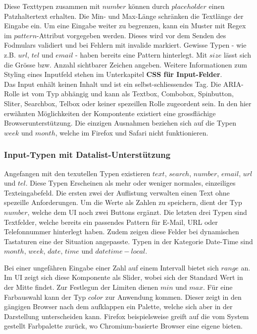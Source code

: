 Diese Texttypen zusammen mit $number$ können durch $placeholder$ einen Patzhaltertext erhalten.
Die Min- und Max-Länge schränken die Textlänge der Eingabe ein.
Um eine Eingabe weiter zu begrenzen, kann ein Muster mit Regex im $pattern$-Attribut vorgegeben werden.
Dieses wird vor dem Senden des Fodmulars validiert und bei Fehlern mit invalide markiert.
Gewisse Typen - wie z.B. $url$, $tel$ und $email$ - haben bereits eine Pattern hinterlegt.
Mit $size$ lässt sich die Grösse bzw. Anzahl sichtbarer Zeichen angeben.
Weitere Informationen zum Styling eines Inputfeld stehen im Unterkapitel \textbf{CSS für Input-Felder}.
\\
Das Input enhält keinen Inhalt und ist ein selbst-schliessendes Tag.
Die ARIA-Rolle ist vom Typ abhängig und kann als Textbox, Combobox, Spinbutton, Sliter, Searchbox, Telbox oder keiner spezeillen Rolle zugeordent sein.
In den hier erwähnten Möglichkeiten der Kompontente existiert eine grossflächige Browserunterstützung.
Die einzigen Ausnahmen beziehen sich auf die Typen $week$ und $month$, welche im Firefox und Safari nicht funktionieren.

\subsubsection{Input-Typen mit Datalist-Unterstützung}
Angefangen mit den texutellen Typen existieren $text$, $search$, $number$, $email$, $url$ und $tel$.
Diese Typen Erscheinen als mehr oder weniger normales, einzeiliges Texteingabefeld.
Die ersten zwei der Auflistung verwalten einen Text ohne spezeille Anforderungen. 
Um die Werte als Zahlen zu speichern, dient der Typ $number$, welche dem UI noch zwei Buttons ergänzt.
Die letzten drei Typen sind Textfelder, welche bereits ein passendes Pattern für E-Mail, URL oder Telefonnummer hinterlegt haben.
Zudem zeigen diese Felder bei dynamischen Tastaturen eine der Situation angepasste\footnotemark.
Typen in der Kategorie Date-Time sind $month$, $week$, $date$, $time$ und $datetime-local$.

Bei einer ungefähren Eingabe einer Zahl auf einem Intervall bietet sich $range$ an.
Im UI zeigt sich diese Komponente als Slider, wobei sich der Standard Wert in der Mitte findet.
Zur Festlegun der Limiten dienen $min$ und $max$.
Für eine Farbauswahl kann der Typ $color$ zur Anwendung kommen. 
Dieser zeigt in den gängigen Browser nach dem aufklappen ein Palette, welche sich aber in der Darstellung unterscheiden kann. 
Firefox beispielsweise greift auf die vom System gestellt Farbpalette zurück, wo Chromium-basierte Browser eine eigene bieten.

